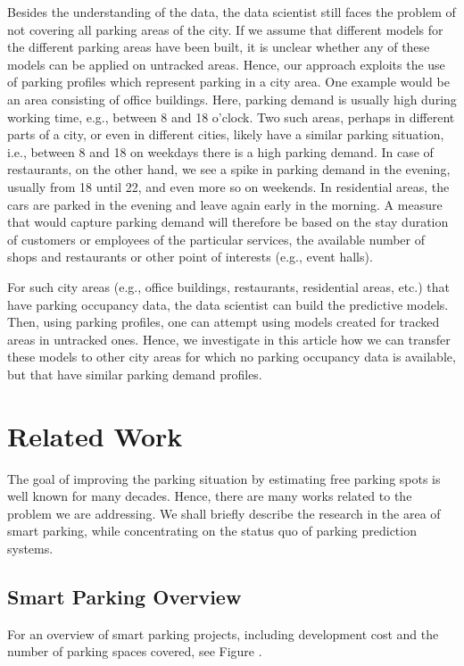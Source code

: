 Besides the understanding of the data, the data scientist still faces the problem of not covering all parking areas of the city. 
If we assume that different models for the different parking areas have been built, it is unclear whether any of these models can be applied on untracked areas. 
Hence, our approach exploits the use of parking profiles which represent parking in a city area. One example would be an area consisting of office buildings. Here, parking demand is usually high during working time, e.g., between 8 and 18 o'clock. Two such areas, perhaps in different parts of a city, or even in different cities, likely have a similar parking situation, i.e., between 8 and 18 on weekdays there is a high parking demand. In case of restaurants, on the other hand, we see a spike in parking demand in the evening, usually from 18 until 22, and even more so on weekends. In residential areas, the cars are parked in the evening and leave again early in the morning. A measure that would capture parking demand will therefore be based on the stay duration of customers or employees of the particular services, the available number of shops and restaurants or other point of interests (e.g., event halls). 

For such city areas (e.g., office buildings, restaurants, residential areas, etc.) that have parking occupancy data, the data scientist can build the predictive models. 
Then, using parking profiles, one can attempt using models created for tracked areas in untracked ones. 
Hence, we investigate in this article how we can transfer these models to other city areas for which no parking occupancy data is available, but that have similar parking demand profiles. 

\section{Related Work}
\label{sec:relwork}
The goal of improving the parking situation by estimating free parking spots is well known for many decades. 
Hence, there are many works related to the problem we are addressing. We shall briefly describe the research in the area of smart parking, while concentrating on the status quo of parking prediction systems.

\subsection{Smart Parking Overview}
\label{sec:relwork_smart_parking}

For an overview of smart parking projects, including development cost and the number of parking spaces covered, see Figure .


